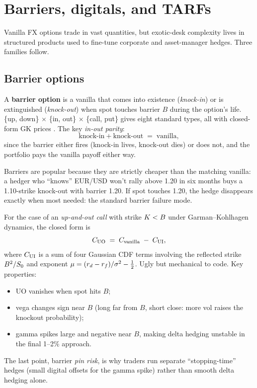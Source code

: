 \section{Barriers, digitals, and TARFs}
\label{sec:fx_exotics}

Vanilla FX options trade in vast quantities, but exotic-desk
complexity lives in structured products used to fine-tune corporate
and asset-manager hedges.  Three families follow.

\subsection{Barrier options}

A \textbf{barrier option} is a vanilla that comes into existence
(\emph{knock-in}) or is extinguished (\emph{knock-out}) when spot
touches barrier $B$ during the option's life.  \{up, down\} $\times$
\{in, out\} $\times$ \{call, put\} gives eight standard types, all
with closed-form GK prices
\citep[see][Ch.\ 26 and 19]{hull8ed}.  The key \emph{in-out parity}:
\begin{equation}
  \text{knock-in} + \text{knock-out} \;=\; \text{vanilla},
  \label{eq:in_out_parity}
\end{equation}
since the barrier either fires (knock-in lives, knock-out dies) or
does not, and the portfolio pays the vanilla payoff either way.

Barriers are popular because they are strictly cheaper than the
matching vanilla: a hedger who ``knows'' EUR/USD won't rally above
1.20 in six months buys a 1.10-strike knock-out with barrier 1.20.
If spot touches 1.20, the hedge disappears exactly when most needed:
the standard barrier failure mode.

For the case of an \emph{up-and-out call} with strike $K <
B$ under Garman--Kohlhagen dynamics, the closed form is
\citep[][Ch.\ 26]{hull8ed}
\begin{equation}
  C_{\mathrm{UO}} \;=\;
  C_{\mathrm{vanilla}}
  \;-\; C_{\mathrm{UI}},
  \label{eq:uo_decomp}
\end{equation}
where $C_{\mathrm{UI}}$ is a sum of four Gaussian CDF terms
involving the reflected strike $B^2/S_0$ and exponent
$\mu = (r_d - r_f)/\sigma^2 - \tfrac12$.  Ugly but mechanical to
code.  Key properties:
\begin{itemize}
  \item UO vanishes when spot hits $B$;
  \item vega changes sign near $B$ (long far from $B$, short close:
    more vol raises the knockout probability);
  \item gamma spikes large and negative near $B$, making delta
    hedging unstable in the final 1--2\% approach.
\end{itemize}
The last point, barrier \emph{pin risk}, is why traders run
separate ``stopping-time'' hedges (small digital offsets for the
gamma spike) rather than smooth delta hedging alone.

